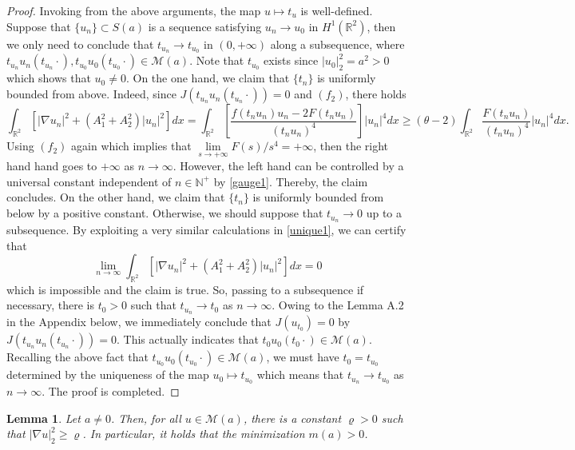 \documentclass[11pt]{amsart}
\numberwithin{equation}{section}
\newtheorem{lemma}[theorem]{Lemma}
\theoremstyle{definition}
\newcommand{\R}{\mathbb{R}}
\begin{document}
\begin{proof}
Invoking from the above arguments, the map $u\mapsto t_u$ is well-defined.
Suppose that $\{u_n\}\subset S(a)$ is a sequence satisfying $u_n\to u_0$ in $H^1(\R^2)$,
then we only need to conclude that $t_{u_n}\to t_{u_0}$ in $(0,+\infty)$ along a subsequence,
where $t_{u_n}u_n(t_{u_n}\cdot), t_{u_0}u_0(t_{u_0}\cdot)\in \mathcal{M}(a)$.
Note that $t_{u_0}$ exists since $|u_0|_2^2=a^2>0$ which shows that $u_0\neq0$.
On the one hand, we claim that $\{t_n\}$ is uniformly bounded from above. Indeed,
since $J(t_{u_n}u_n(t_{u_n}\cdot))=0$ and $(f_2)$, there holds
\[
\int_{\R^2}[|\nabla u_n|^2 + (A_1^2+A_2^2)|u_n|^2]dx= \int_{\R^2}\left[\frac{f(t_nu_n)u_n-2F(t_nu_n)}{(t_nu_n)^4}\right]|u_n|^4dx
\geq (\theta-2)\int_{\R^2} \frac{ F(t_nu_n)}{(t_nu_n)^4} |u_n|^4dx.
\]
Using $(f_2)$ again which implies that $\lim\limits_{s\to+\infty}F(s)/s^4=+\infty$,
then the right hand hand goes to $+\infty$ as $n\to\infty$.
However, the left hand can be controlled by a universal constant independent of $n\in \mathbb{N}^+$
by \eqref{gauge1}. Thereby, the claim concludes.
On the other hand, we claim that $\{t_n\}$ is uniformly bounded from below by a positive constant.
Otherwise, we should suppose that $t_{u_n}\to0$ up to a subsequence. By
exploiting a very similar calculations in \eqref{unique1},
we can certify that
\[
\lim_{n\to\infty}\int_{\R^2}[|\nabla u_n|^2 + (A_1^2+A_2^2)|u_n|^2]dx=0
\]
which is impossible and the claim is true. So, passing to a subsequence if necessary, there is $t_0>0$
such that $t_{u_n}\to t_0$ as $n\to\infty$. Owing to the Lemma A.2 in the Appendix below,
we immediately conclude that $J(u_{t_0})=0$ by $J(t_{u_n}u_n(t_{u_n}\cdot))=0$.
This actually indicates that $t_{0}u_0(t_{0}\cdot)\in \mathcal{M}(a)$. Recalling the above fact that
$t_{u_0}u_0(t_{u_0}\cdot)\in \mathcal{M}(a)$, we must have $t_0=t_{u_0}$
determined by
the uniqueness of the map $u_0\mapsto t_{u_0}$ which means that $t_{u_n}\to t_{u_0}$ as $n\to\infty$. The proof is completed.
 \end{proof}


 \begin{lemma}\label{positive} Let $a\neq0$. Then, for all $u\in \mathcal{M}(a)$,
there is a constant $\varrho>0$ such that
$|\nabla u|_2^2\geq\varrho$. In particular, it holds that
the minimization $m(a)>0$.
\end{lemma}
\end{document}
